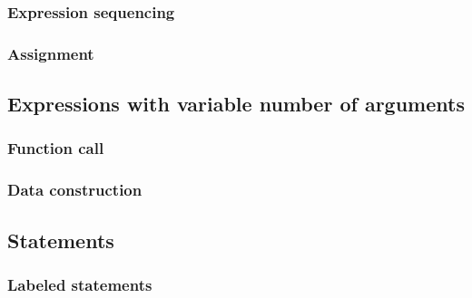 \documentclass[letter,11pt]{article}
\begin{document}
\subsubsection{Expression sequencing}

\subsubsection{Assignment}


\subsection{Expressions with variable number of arguments}
\label{sec:interface:var-args-expr}

\subsubsection{Function call}


\subsubsection{Data construction}



\subsection{Statements}

\subsubsection{Labeled statements}

\end{document}
